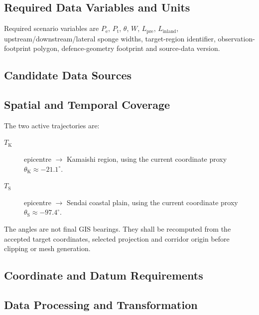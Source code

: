 \subsection{Required Data Variables and Units}
\label{sec:res-dat-scn-required-data-variables-units}

Required scenario variables are
$P_{\mathrm{e}}$, $P_{\mathrm{t}}$, $\theta$, $W$,
$L_{\mathrm{pre}}$, $L_{\mathrm{inland}}$, upstream/downstream/lateral
sponge widths, target-region identifier, observation-footprint polygon,
defence-geometry footprint and source-data version.

\subsection{Candidate Data Sources}
\label{sec:res-dat-scn-candidate-data-sources}


\subsection{Spatial and Temporal Coverage}
\label{sec:res-dat-scn-spatial-temporal-coverage}

The two active trajectories are:

\begin{description}
  \item[$T_{\mathrm{K}}$] epicentre $\rightarrow$ Kamaishi region,
    using the current coordinate proxy
    $\theta_{\mathrm{K}}\approx -21.1^{\circ}$.
  \item[$T_{\mathrm{S}}$] epicentre $\rightarrow$ Sendai coastal
    plain, using the current coordinate proxy
    $\theta_{\mathrm{S}}\approx -97.4^{\circ}$.
\end{description}

The angles are not final GIS bearings. They shall be recomputed from
the accepted target coordinates, selected projection and corridor
origin before clipping or mesh generation.

\subsection{Coordinate and Datum Requirements}
\label{sec:res-dat-scn-coordinate-datum-requirements}


\subsection{Data Processing and Transformation}
\label{sec:res-dat-scn-data-processing-transformation}

